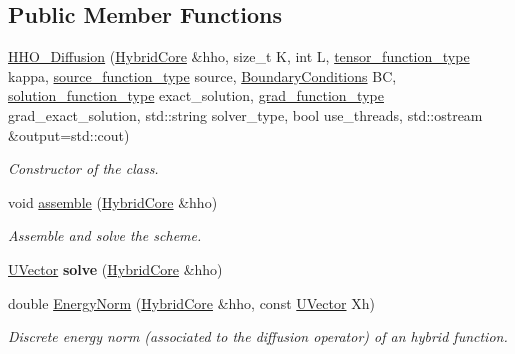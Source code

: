\subsection*{Public Member Functions}
\begin{DoxyCompactItemize}
\item 
\hyperlink{group__HHO__Diffusion_ga5dd0238ced5e1ace4c0581d779e4e76d}{H\+H\+O\+\_\+\+Diffusion} (\hyperlink{classHArDCore2D_1_1HybridCore}{Hybrid\+Core} \&hho, size\+\_\+t K, int L, \hyperlink{classHArDCore2D_1_1HHO__Diffusion_a5c4f7bf42c46d5bd8fde47396c2a9de5}{tensor\+\_\+function\+\_\+type} kappa, \hyperlink{classHArDCore2D_1_1HHO__Diffusion_afc8040de1122421f070bb19231db5431}{source\+\_\+function\+\_\+type} source, \hyperlink{classBoundaryConditions}{Boundary\+Conditions} BC, \hyperlink{classHArDCore2D_1_1HHO__Diffusion_ad64a9a3249e7345e7dbaafb7b578f524}{solution\+\_\+function\+\_\+type} exact\+\_\+solution, \hyperlink{classHArDCore2D_1_1HHO__Diffusion_a9f9412bc2a0a28033591d2e8a5750d90}{grad\+\_\+function\+\_\+type} grad\+\_\+exact\+\_\+solution, std\+::string solver\+\_\+type, bool use\+\_\+threads, std\+::ostream \&output=std\+::cout)
\begin{DoxyCompactList}\small\item\em Constructor of the class. \end{DoxyCompactList}\item 
void \hyperlink{group__HHO__Diffusion_gaa78a74bda050f0773e920c00c297c858}{assemble} (\hyperlink{classHArDCore2D_1_1HybridCore}{Hybrid\+Core} \&hho)
\begin{DoxyCompactList}\small\item\em Assemble and solve the scheme. \end{DoxyCompactList}\item 
\hyperlink{classHArDCore2D_1_1UVector}{U\+Vector} {\bfseries solve} (\hyperlink{classHArDCore2D_1_1HybridCore}{Hybrid\+Core} \&hho)
\item 
double \hyperlink{group__HHO__Diffusion_ga9f9382eebdf3542db2e11d7770e90565}{Energy\+Norm} (\hyperlink{classHArDCore2D_1_1HybridCore}{Hybrid\+Core} \&hho, const \hyperlink{classHArDCore2D_1_1UVector}{U\+Vector} Xh)
\begin{DoxyCompactList}\small\item\em Discrete energy norm (associated to the diffusion operator) of an hybrid function. \end{DoxyCompactList}\item 
\mbox{\label{classHArDCore2D_1_1HHO__Diffusion_a2f9d10916800747ae977e901931309da}} 

\end{DoxyCompactItemize}
